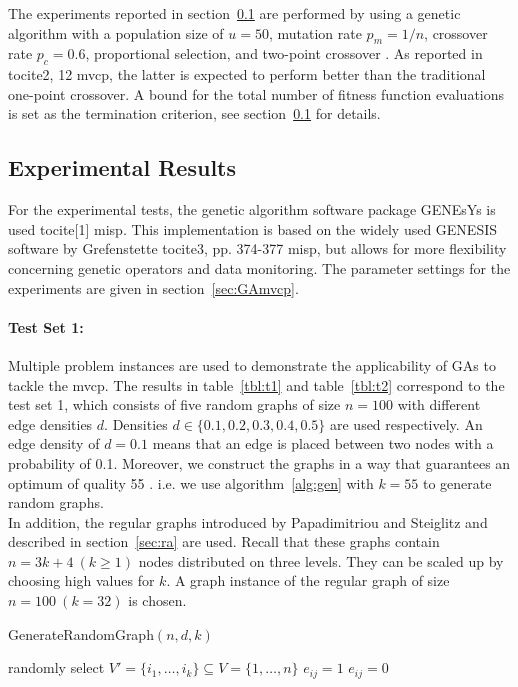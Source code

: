 \documentclass[12pt]{article}
\begin{document}
The experiments reported in section~\ref{sec:er} are performed
by using a genetic algorithm with a population size of
$u = 50$, mutation rate $p_m = 1/n$, crossover rate
$p_c = 0.6$, proportional selection, and two-point crossover \cite{mvcp-back}.
As reported in tocite{2, 12 mvcp}, the latter is expected to perform
better than the traditional one-point crossover.
A bound for the total number
of fitness function evaluations is set as the termination
criterion, see section~\ref{sec:er} for details.


\subsection{Experimental Results}
\label{sec:er}
For the experimental tests,
the genetic algorithm software package GENEsYs is used tocite{[1] misp}.
This implementation is based on the widely used GENESIS software by Grefenstette tocite{3, pp. 374-377 misp},
but allows for more  flexibility concerning genetic operators and data monitoring.
The parameter settings for the experiments are
given in section~\ref{sec:GAmvcp}.

\paragraph{Test Set 1:}
Multiple problem instances are used to demonstrate the applicability of GAs to tackle the mvcp.
The results in table~\ref{tbl:t1}
and table~\ref{tbl:t2} correspond to the test set 1, which consists of
five random graphs of size $n = 100$ with different
edge densities $d$.
Densities $d \in \{0.1, 0.2, 0.3, 0.4, 0.5\}$ are used respectively.
An edge density of $d = 0.1$ means that an edge is placed between two
nodes with a probability of 0.1.
Moreover, we construct the graphs in a way that guarantees an optimum of quality 55 \cite{mvcp-back}.
i.e. we use algorithm~\ref{alg:gen} with $k = 55$ to generate random graphs.\\
In addition, the regular graphs introduced by
Papadimitriou and Steiglitz and described in section~\ref{sec:ra} are used.
Recall that these graphs contain $n=3k+4 \ (k \geq 1)$ nodes distributed on three levels.
They can be scaled up by choosing high values for $k$.
A graph instance of the regular graph of size $n = 100 \  (k=32)$ is chosen.

\begin{algorithm}
\caption{GenerateRandomGraph$(n, d, k)$}
\label{alg:gen}
\begin{algorithmic}[1]


\State randomly select $V' = \{i_1, \dots, i_k\} \subseteq V = \{1, \dots, n\}$
\State
{}
\State $e_{ij} = 1$
\Else
\State $e_{ij} = 0$
\EndIf
\EndFor
\EndFor


\end{algorithmic}
\end{algorithm}
\end{document}
